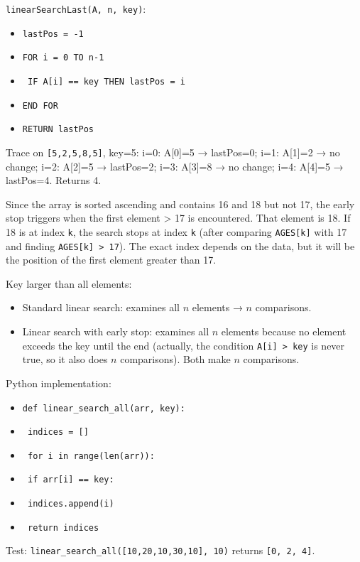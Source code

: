 \documentclass[11pt]{article}
\begin{document}
\begin{corrige}[Exercise 1]
\texttt{linearSearchLast(A, n, key)}:
\begin{itemize}
    \item \texttt{lastPos = -1}
    \item \texttt{FOR i = 0 TO n-1}
    \item \texttt{    IF A[i] == key THEN lastPos = i}
    \item \texttt{END FOR}
    \item \texttt{RETURN lastPos}
\end{itemize}
Trace on \texttt{[5,2,5,8,5]}, key=5:
i=0: A[0]=5 → lastPos=0; i=1: A[1]=2 → no change; i=2: A[2]=5 → lastPos=2; i=3: A[3]=8 → no change; i=4: A[4]=5 → lastPos=4. Returns 4.
\end{corrige}

\begin{corrige}[Exercise 2]
Since the array is sorted ascending and contains 16 and 18 but not 17, the early stop triggers when the first element > 17 is encountered. That element is 18. If 18 is at index \texttt{k}, the search stops at index \texttt{k} (after comparing \texttt{AGES[k]} with 17 and finding \texttt{AGES[k] > 17}). The exact index depends on the data, but it will be the position of the first element greater than 17.
\end{corrige}

\begin{corrige}[Exercise 3]
Key larger than all elements:
\begin{itemize}
    \item Standard linear search: examines all $n$ elements → $n$ comparisons.
    \item Linear search with early stop: examines all $n$ elements because no element exceeds the key until the end (actually, the condition \texttt{A[i] > key} is never true, so it also does $n$ comparisons). Both make $n$ comparisons.
\end{itemize}
\end{corrige}

\begin{corrige}[Exercise 4]
Python implementation:
\begin{itemize}
    \item \texttt{def linear\_search\_all(arr, key):}
    \item \texttt{    indices = []}
    \item \texttt{    for i in range(len(arr)):}
    \item \texttt{        if arr[i] == key:}
    \item \texttt{            indices.append(i)}
    \item \texttt{    return indices}
\end{itemize}
Test: \texttt{linear\_search\_all([10,20,10,30,10], 10)} returns \texttt{[0, 2, 4]}.
\end{corrige}
\end{document}
